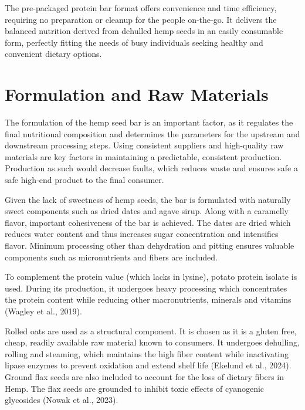 \vspace{1em}
The pre-packaged protein bar format offers convenience and time efficiency, requiring no preparation or cleanup for the people on-the-go. It delivers the balanced nutrition derived from dehulled hemp seeds in an easily consumable form, perfectly fitting the needs of busy individuals seeking healthy and convenient dietary options.


\section{Formulation and Raw Materials}
The formulation of the hemp seed bar is an important factor, as it regulates the final nutritional composition and determines the parameters for the upstream and downstream processing steps. Using consistent suppliers and high-quality raw materials are key factors in maintaining a predictable, consistent production. Production as such would decrease faults, which reduces waste and ensures safe a safe high-end product to the final consumer. 

\vspace{1em}
Given the lack of sweetness of hemp seeds, the bar is formulated with naturally sweet components such as dried dates and agave sirup. Along with a caramelly flavor, important cohesiveness of the bar is achieved. The dates are dried which reduces water content and thus increases sugar concentration and intensifies flavor. Minimum processing other than dehydration and pitting ensures valuable components such as micronutrients and fibers are included.

\vspace{1em}
To complement the protein value (which lacks in lysine), potato protein isolate is used. During its production, it undergoes heavy processing which concentrates the protein content while reducing other macronutrients, minerals and vitamins (Wagley et al., 2019).

\vspace{1em}
Rolled oats are used as a structural component. It is chosen as it is a gluten free, cheap, readily available raw material known to consumers. It undergoes dehulling, rolling and steaming, which maintains the high fiber content while inactivating lipase enzymes to prevent oxidation and extend shelf life (Ekelund et al., 2024). Ground flax seeds are also included to account for the loss of dietary fibers in Hemp. The flax seeds are grounded to inhibit toxic effects of cyanogenic glycosides (Nowak et al., 2023).

